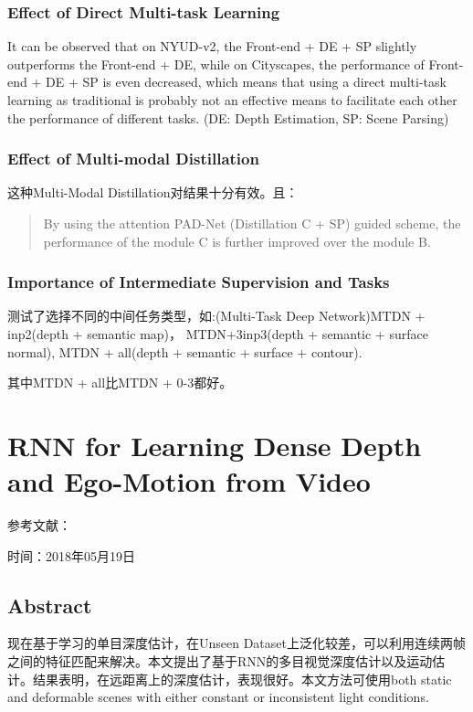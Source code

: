 \subsubsection{Effect of Direct Multi-task Learning}
It can be observed that on NYUD-v2, the Front-end + DE + SP slightly outperforms the Front-end
+ DE, while on Cityscapes, the performance of Front-end + DE + SP is even decreased, which means that using a direct multi-task learning as traditional is probably not an effective means to facilitate each other the performance of different tasks. (DE: Depth Estimation, SP: Scene Parsing)

\subsubsection{Effect of Multi-modal Distillation}
这种Multi-Modal Distillation对结果十分有效。且：
\begin{quote}
By using the attention PAD-Net (Distillation C + SP) guided scheme, the performance of the module C is further improved over the module B.
\end{quote}

\subsubsection{Importance of Intermediate Supervision and Tasks}

测试了选择不同的中间任务类型，如:(Multi-Task Deep Network)MTDN + inp2(depth + semantic map)， MTDN+3inp3(depth + semantic + surface normal), MTDN + all(depth + semantic + surface + contour).

其中MTDN + all比MTDN + 0-3都好。

\section{RNN for Learning Dense Depth and Ego-Motion from Video}

参考文献：\cite{Wang2018DenseSLAMNet}

{\color{red}时间：2018年05月19日}

\subsection{Abstract}

现在基于学习的单目深度估计，在Unseen Dataset上泛化较差，可以利用连续两帧之间的特征匹配来解决。本文提出了基于RNN的多目视觉深度估计以及运动估计。结果表明，在远距离上的深度估计，表现很好。本文方法可使用both static and deformable scenes with either constant or inconsistent light conditions.

